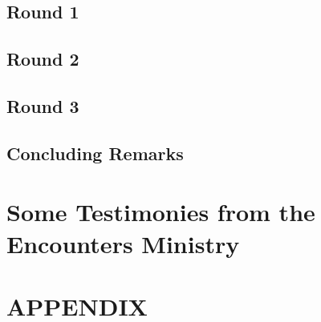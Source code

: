 \documentclass[oneside]{book}
\begin{document}
\section*{Round 1}
\lipsum[1]
\section{Round 2}
\lipsum[1]
\section{Round 3}
\section{Concluding Remarks}

\backmatter
\clearpage

\chapter*{Some Testimonies from the Encounters Ministry}
\chapter*{APPENDIX}
\end{document}
